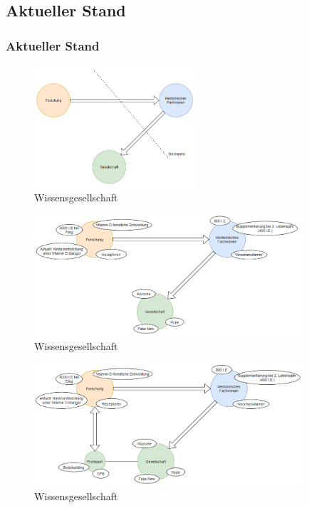 \documentclass[xcolor=dvipsnames]{beamer}
\begin{document}
    \subsection{Aktueller Stand}
    \begin{frame}[allowframebreaks]
        \frametitle{Aktueller Stand}

        \begin{figure}
            \includegraphics[width=6cm]{../images/wissensgesellschaft_3.png}
            \caption{Wissensgesellschaft}
        \end{figure}

        \framebreak

        \begin{figure}
            \includegraphics[width=10cm]{../images/wissensgesellschaft_vitamin_d.png}
            \caption{Wissensgesellschaft}
        \end{figure}

        \framebreak

        \begin{figure}
            \includegraphics[width=10cm]{../images/wissensgesellschaft_vitamin_d_sport.png}
            \caption{Wissensgesellschaft}
        \end{figure}


    \end{frame}
\end{document}
